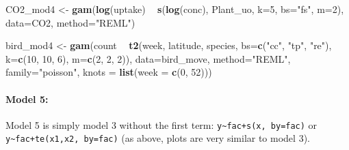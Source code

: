 \documentclass[12pt]{article}
\newenvironment{Shaded}{\begin{snugshade}}{\end{snugshade}}
\newcommand{\KeywordTok}[1]{\textcolor[rgb]{0.13,0.29,0.53}{\textbf{#1}}}
\newcommand{\DataTypeTok}[1]{\textcolor[rgb]{0.13,0.29,0.53}{#1}}
\newcommand{\DecValTok}[1]{\textcolor[rgb]{0.00,0.00,0.81}{#1}}
\newcommand{\StringTok}[1]{\textcolor[rgb]{0.31,0.60,0.02}{#1}}
\newcommand{\OperatorTok}[1]{\textcolor[rgb]{0.81,0.36,0.00}{\textbf{#1}}}
\newcommand{\NormalTok}[1]{#1}
\let\oldparagraph\paragraph
\renewcommand{\paragraph}[1]{\oldparagraph{#1}\mbox{}}
\begin{document}
\begin{Shaded}
\begin{Highlighting}[]
\NormalTok{CO2_mod4 <-}\StringTok{ }\KeywordTok{gam}\NormalTok{(}\KeywordTok{log}\NormalTok{(uptake) }\OperatorTok{~}\StringTok{ }\KeywordTok{s}\NormalTok{(}\KeywordTok{log}\NormalTok{(conc), Plant_uo, }\DataTypeTok{k=}\DecValTok{5}\NormalTok{, }\DataTypeTok{bs=}\StringTok{"fs"}\NormalTok{, }\DataTypeTok{m=}\DecValTok{2}\NormalTok{),}
                \DataTypeTok{data=}\NormalTok{CO2, }\DataTypeTok{method=}\StringTok{"REML"}\NormalTok{)}

\NormalTok{bird_mod4 <-}\StringTok{ }\KeywordTok{gam}\NormalTok{(count }\OperatorTok{~}\StringTok{ }\KeywordTok{t2}\NormalTok{(week, latitude, species, }\DataTypeTok{bs=}\KeywordTok{c}\NormalTok{(}\StringTok{"cc"}\NormalTok{, }\StringTok{"tp"}\NormalTok{, }\StringTok{"re"}\NormalTok{),}
                            \DataTypeTok{k=}\KeywordTok{c}\NormalTok{(}\DecValTok{10}\NormalTok{, }\DecValTok{10}\NormalTok{, }\DecValTok{6}\NormalTok{), }\DataTypeTok{m=}\KeywordTok{c}\NormalTok{(}\DecValTok{2}\NormalTok{, }\DecValTok{2}\NormalTok{, }\DecValTok{2}\NormalTok{)),}
                 \DataTypeTok{data=}\NormalTok{bird_move, }\DataTypeTok{method=}\StringTok{"REML"}\NormalTok{, }\DataTypeTok{family=}\StringTok{"poisson"}\NormalTok{,}
                 \DataTypeTok{knots =} \KeywordTok{list}\NormalTok{(}\DataTypeTok{week =} \KeywordTok{c}\NormalTok{(}\DecValTok{0}\NormalTok{, }\DecValTok{52}\NormalTok{)))}
\end{Highlighting}
\end{Shaded}

\paragraph{Model 5:}\label{model-5}

Model 5 is simply model 3 without the first term:
\texttt{y\textasciitilde{}fac+s(x,\ by=fac)} or
\texttt{y\textasciitilde{}fac+te(x1,x2,\ by=fac)} (as above, plots are
very similar to model 3).
\end{document}
